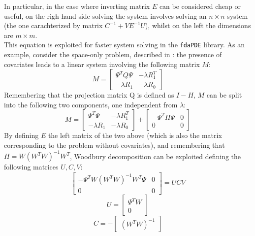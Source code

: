 In particular, in the case where inverting matrix $E$ can be considered cheap or useful, on the righ-hand side solving the system involves solving an $n\times n$ system (the one carachterized by matrix $C^{-1} + V E^{-1}U$), whilst on the left the dimensions are $m\times m$.\\
This equation is exploited for faster system solving in the \verb|fdaPDE| library. As an example, consider the space-only problem, described \eg in \cite{sangalli}: the presence of covariates leads to a linear system involving the following matrix $M$:
\begin{equation*}
    M =
    \begin{bmatrix}
        \Psi^TQ\Psi & -\lambda R_1^T\\
        -\lambda R_1  & -\lambda R_0
    \end{bmatrix}
\end{equation*}
Remembering that the projection matrix Q is defined as $I-H$, $M$ can be split into the following two components, one independent from $\lambda$:
\begin{equation*}
    M =
    \begin{bmatrix}
        \Psi^T\Psi & -\lambda R_1^T\\
        -\lambda R_1  & -\lambda R_0
    \end{bmatrix}
    +
    \begin{bmatrix}
        -\Psi^TH\Psi & 0\\
        0 & 0
    \end{bmatrix}
\end{equation*}
By defining $E$ the left matrix of the two above (which is also the matrix corresponding to the problem without covariates), and remembering that $H = W\left(W^TW\right)^{-1}W^T$, Woodbury decomposition can be exploited defining the following matrices $U, C, V$:
\begin{equation*}     
    \begin{bmatrix}
        -\Psi^TW\left(W^TW\right)^{-1}W^T\Psi & 0\\
        0 & 0
    \end{bmatrix} = UCV
\end{equation*}
\begin{equation*}
    U = 
    \begin{bmatrix}
        \Psi^TW\\
        0
    \end{bmatrix}
\end{equation*}
\begin{equation*}
    C = -
    \begin{bmatrix}
        \left(W^TW\right)^{-1}
    \end{bmatrix}
\end{equation*}
